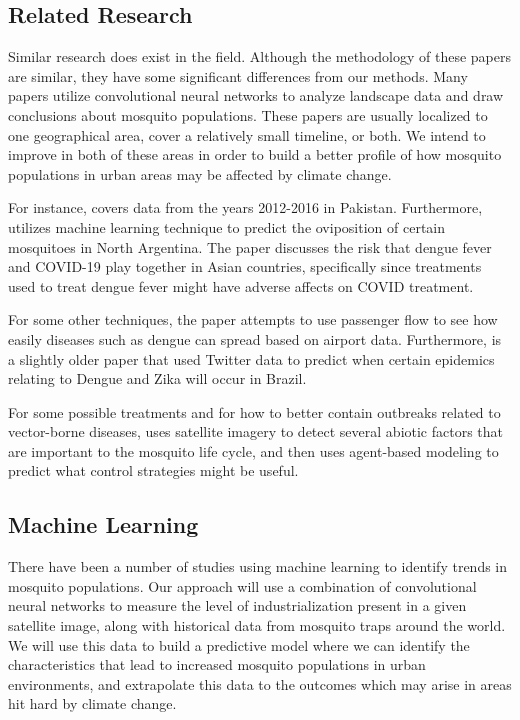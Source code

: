 \documentclass[11pt]{article}
\begin{document}
\subsection{Related Research}
Similar research does exist in the field. Although the methodology of these papers are similar, they have some significant differences from our methods. Many papers utilize convolutional neural networks to analyze landscape data and draw conclusions about mosquito populations. These papers are usually localized to one geographical area, cover a relatively small timeline, or both. We intend to improve in both of these areas in order to build a better profile of how mosquito populations in urban areas may be affected by climate change.

For instance, \cite{deeplandscape} covers data from the years 2012-2016 in Pakistan. Furthermore, \cite{ModelingDV} utilizes machine learning technique to predict the oviposition of certain mosquitoes in North Argentina.  The paper \cite{doublepunch} discusses the risk that dengue fever and COVID-19 play together in Asian countries, specifically since treatments used to treat dengue fever might have adverse affects on COVID treatment. 

For some other techniques, the paper \cite{dengue} attempts to use passenger flow to see how easily diseases such as dengue can spread based on airport data. Furthermore, \cite{twitter} is a slightly older paper that used Twitter data to predict when certain epidemics relating to Dengue and Zika will occur in Brazil. 

For some possible treatments and for how to better contain outbreaks related to vector-borne diseases, \cite{agent} uses satellite imagery to detect several abiotic factors that are important to the mosquito life cycle, and then uses agent-based modeling to predict what control strategies might be useful. 

\subsection{Machine Learning}
There have been a number of studies using machine learning to identify trends in mosquito populations. Our approach will use a combination of convolutional neural networks to measure the level of industrialization present in a given satellite image, along with historical data from mosquito traps around the world. We will use this data to build a predictive model where we can identify the characteristics that lead to increased mosquito populations in urban environments, and extrapolate this data to the outcomes which may arise in areas hit hard by climate change.
\end{document}
